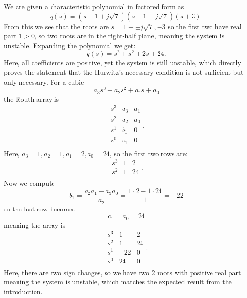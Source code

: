 \begin{exa}
  We are given a characteristic polynomial in factored form as
  \begin{equation*}
    q(s) = \left( s - 1 + j \sqrt{7} \right) \left( s - 1 - j \sqrt{7} \right) \left( s + 3 \right)
  .\end{equation*}
  From this we see that the roots are $s = 1 + \pm j \sqrt{7}, -3$ so the first two have real part $1 > 0$, so two roots are in the right-half plane, meaning the system is unstable.
  Expanding the polynomial we get:
  \begin{equation*}
    q(s) = s^3 + s^2 + 2s + 24
  .\end{equation*}
  Here, all coefficients are positive, yet the system is still unstable, which directly proves the statement that the Hurwitz's necessary condition is not sufficient but only necessary.
  \tcblower
  For a cubic
  \begin{equation*}
    a_3 s^3 + a_2 s^2 + a_1 s + a_0
  \end{equation*}
  the Routh array is
  \begin{equation*}
    \begin{array}{c|ccc}
      s^3 & a_3 & a_1\\
    s^2 & a_2 & a_0\\
    s^{1} & b_1 & 0\\
    s^{0} & c_1 & 0\\
    \end{array}
  .\end{equation*}
  Here, $a_3 = 1, a_2 = 1, a_1 = 2, a_0 = 24$, so the first two rows are:
  \begin{equation*}
    \begin{array}{c|cc}
      s^3 & 1 & 2\\
    s^2 & 1 & 24\\
    \end{array}
  .\end{equation*}
  Now we compute
  \begin{equation*}
    b_1 = \frac{a_2 a_1 - a_3 a_0}{a_2} = \frac{1 \cdot 2 - 1\cdot 24}{1} = - 22
  \end{equation*}
  so the last row becomes
  \begin{equation*}
    c_1 = a_0 = 24
  \end{equation*}
  meaning the array is
  \begin{equation*}
    \begin{array}{c|ccc}
      s^3 & 1 & 2\\
    s^2 & 1 & 24\\
    s^{1} & -22 & 0\\
    s^{0} & 24 &0 \\
    \end{array}
  .\end{equation*}
  Here, there are two sign changes, so we have two 2 roots with positive real part meaning the system is unstable, which matches the expected result from the introduction. 
\end{exa}
